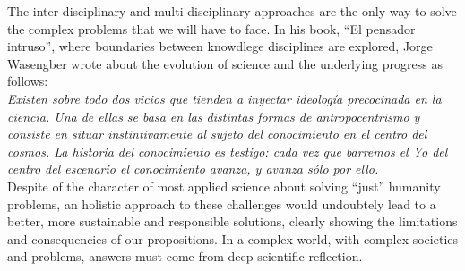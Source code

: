 The inter-disciplinary and multi-disciplinary approaches are the only way to solve the complex problems that we will have to face. In his book, ``El pensador intruso'', where boundaries between knowdlege disciplines are explored, Jorge Wasengber wrote about the evolution of science and the underlying progress as follows:\\ 

\textit{Existen sobre todo dos vicios que tienden a inyectar ideología precocinada en la ciencia. Una de ellas se basa en las distintas formas de antropocentrismo y consiste en situar instintivamente al sujeto del conocimiento en el centro del cosmos. La historia del conocimiento es testigo: cada vez que barremos el Yo del centro del escenario el conocimiento avanza, y avanza sólo por ello.}\\

Despite of the character of most applied science about solving ``just'' humanity problems, an holistic approach to these challenges would undoubtely lead to a better, more sustainable and responsible solutions, clearly showing the limitations and consequencies of our propositions. In a complex world, with complex societies and problems, answers must come from deep scientific reflection.


